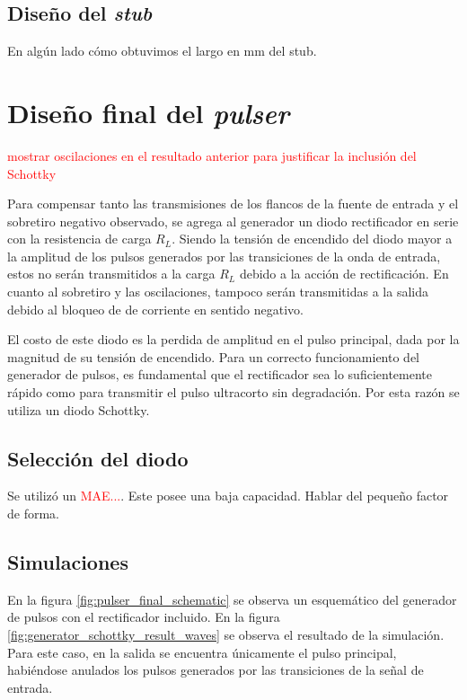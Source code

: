 \subsection{Diseño del \textit{stub}}

En algún lado cómo obtuvimos el largo en mm del stub.

\section{Diseño final del \textit{pulser}}

\textcolor{red}{mostrar oscilaciones en el resultado anterior para justificar la
inclusión del Schottky}

Para compensar tanto las transmisiones de los flancos de la fuente de entrada y
el sobretiro negativo observado, se agrega al generador un diodo rectificador en
serie con la resistencia de carga $R_L$. Siendo la tensión de encendido del
diodo mayor a la amplitud de los pulsos generados por las transiciones de la
onda de entrada, estos no serán transmitidos a la carga $R_L$ debido a la acción
de rectificación. En cuanto al sobretiro y las oscilaciones, tampoco serán
transmitidas a la salida debido al bloqueo de de corriente en sentido negativo.

El costo de este diodo es la perdida de amplitud en el pulso principal, dada por la
magnitud de su tensión de encendido. Para un correcto funcionamiento del
generador de pulsos, es fundamental que el rectificador sea lo suficientemente
rápido como para transmitir el pulso ultracorto sin degradación. Por esta razón
se utiliza un diodo Schottky.

\subsection{Selección del diodo}

Se utilizó un \textcolor{red}{MAE...}. Este posee una baja capacidad. Hablar del
pequeño factor de forma.

\subsection{Simulaciones}

En la figura \ref{fig:pulser_final_schematic} se observa un esquemático del
generador de pulsos con el rectificador incluido. En la figura
\ref{fig:generator_schottky_result_waves} se observa el resultado de la
simulación. Para este caso, en la salida se encuentra únicamente el pulso
principal, habiéndose anulados los pulsos generados por las transiciones de la
señal de entrada.

